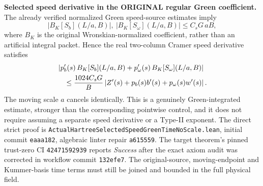 \documentclass[11pt]{amsart}
\begin{document}
\medskip
\noindent\textbf{Selected speed derivative in the ORIGINAL regular
Green coefficient.}
The already verified normalized Green speed-source estimates imply
\[
 |B_K[S_b](L/a,B)|,\ |B_K[S_\omega](L/a,B)|
 \le C_sG\,aB,
\]
where \(B_K\) is the original Wronskian-normalized coefficient,
rather than an artificial integral packet. Hence the real
two-column Cramer speed derivative satisfies
\begin{align}
 &\left|p_b'(s)\,B_K[S_b](L/a,B)
       +p_\omega'(s)\,B_K[S_\omega](L/a,B)\right|\notag\\
 &\quad\le \frac{1024C_sG}{B}
     \left|Z'(s)+p_b(s)b'(s)+p_\omega(s)w'(s)\right|.
 \label{eq:true-hartree-selected-speed-green-time}
\end{align}
The moving scale \(a\) cancels identically. This is a genuinely
Green-integrated estimate, stronger than the corresponding pointwise
control, and it does not require assuming a separate speed derivative
or a Type-II exponent. The direct strict proof is
\texttt{ActualHartreeSelectedSpeedGreenTimeNoScale.lean},
initial commit \texttt{eaaa182}, algebraic linter repair
\texttt{a615559}. The target theorem's pinned trust-zero
CI \texttt{42471592939} reports \emph{Success} after the
exact axiom audit was corrected in workflow commit \texttt{132efe7}.
The original-source, moving-endpoint and Kummer-basis time terms
must still be joined and bounded in the full physical field.
\end{document}
